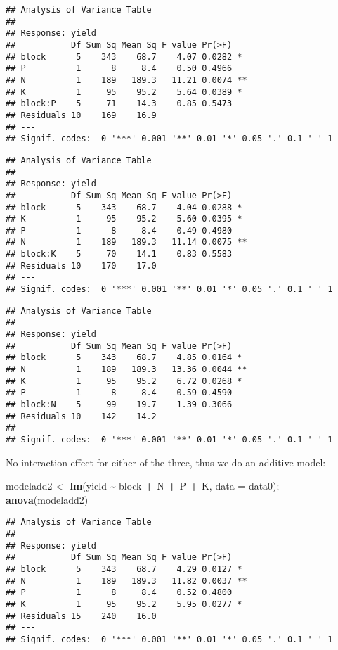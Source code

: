 \documentclass[
]{article}
\newenvironment{Shaded}{\begin{snugshade}}{\end{snugshade}}
\newcommand{\AttributeTok}[1]{\textcolor[rgb]{0.13,0.29,0.53}{#1}}
\newcommand{\FunctionTok}[1]{\textcolor[rgb]{0.13,0.29,0.53}{\textbf{#1}}}
\newcommand{\NormalTok}[1]{#1}
\newcommand{\OtherTok}[1]{\textcolor[rgb]{0.56,0.35,0.01}{#1}}
\newcommand{\SpecialCharTok}[1]{\textcolor[rgb]{0.81,0.36,0.00}{\textbf{#1}}}
\begin{document}
\begin{verbatim}
## Analysis of Variance Table
## 
## Response: yield
##           Df Sum Sq Mean Sq F value Pr(>F)   
## block      5    343    68.7    4.07 0.0282 * 
## P          1      8     8.4    0.50 0.4966   
## N          1    189   189.3   11.21 0.0074 **
## K          1     95    95.2    5.64 0.0389 * 
## block:P    5     71    14.3    0.85 0.5473   
## Residuals 10    169    16.9                  
## ---
## Signif. codes:  0 '***' 0.001 '**' 0.01 '*' 0.05 '.' 0.1 ' ' 1
\end{verbatim}

\begin{verbatim}
## Analysis of Variance Table
## 
## Response: yield
##           Df Sum Sq Mean Sq F value Pr(>F)   
## block      5    343    68.7    4.04 0.0288 * 
## K          1     95    95.2    5.60 0.0395 * 
## P          1      8     8.4    0.49 0.4980   
## N          1    189   189.3   11.14 0.0075 **
## block:K    5     70    14.1    0.83 0.5583   
## Residuals 10    170    17.0                  
## ---
## Signif. codes:  0 '***' 0.001 '**' 0.01 '*' 0.05 '.' 0.1 ' ' 1
\end{verbatim}

\begin{verbatim}
## Analysis of Variance Table
## 
## Response: yield
##           Df Sum Sq Mean Sq F value Pr(>F)   
## block      5    343    68.7    4.85 0.0164 * 
## N          1    189   189.3   13.36 0.0044 **
## K          1     95    95.2    6.72 0.0268 * 
## P          1      8     8.4    0.59 0.4590   
## block:N    5     99    19.7    1.39 0.3066   
## Residuals 10    142    14.2                  
## ---
## Signif. codes:  0 '***' 0.001 '**' 0.01 '*' 0.05 '.' 0.1 ' ' 1
\end{verbatim}

No interaction effect for either of the three, thus we do an additive
model:

\begin{Shaded}
\begin{Highlighting}[]
\NormalTok{modeladd2 }\OtherTok{\textless{}{-}} \FunctionTok{lm}\NormalTok{(yield }\SpecialCharTok{\textasciitilde{}}\NormalTok{ block }\SpecialCharTok{+}\NormalTok{ N }\SpecialCharTok{+}\NormalTok{ P }\SpecialCharTok{+}\NormalTok{ K, }\AttributeTok{data =}\NormalTok{ data0); }\FunctionTok{anova}\NormalTok{(modeladd2)}
\end{Highlighting}
\end{Shaded}

\begin{verbatim}
## Analysis of Variance Table
## 
## Response: yield
##           Df Sum Sq Mean Sq F value Pr(>F)   
## block      5    343    68.7    4.29 0.0127 * 
## N          1    189   189.3   11.82 0.0037 **
## P          1      8     8.4    0.52 0.4800   
## K          1     95    95.2    5.95 0.0277 * 
## Residuals 15    240    16.0                  
## ---
## Signif. codes:  0 '***' 0.001 '**' 0.01 '*' 0.05 '.' 0.1 ' ' 1
\end{verbatim}
\end{document}

